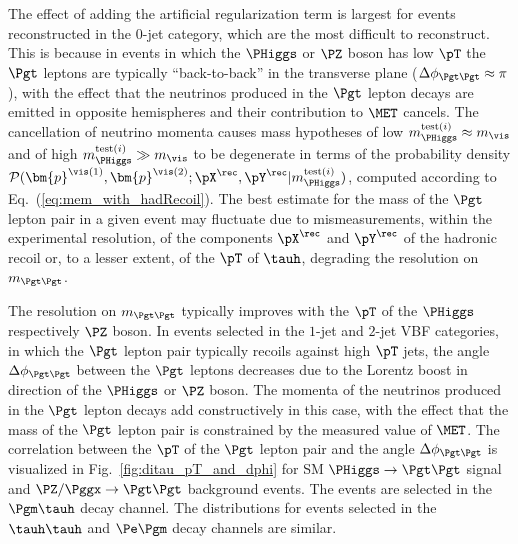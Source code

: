 The effect of adding the artificial regularization term is largest for events reconstructed in the $0$-jet category,
which are the most difficult to reconstruct.
This is because in events in which the $\PHiggs$ or $\PZ$ boson has low $\pT$
the $\Pgt$ leptons are typically ``back-to-back'' in the transverse plane ($\Delta\phi_{\Pgt\Pgt} \approx \pi$), 
with the effect that the neutrinos produced in the $\Pgt$ lepton decays are emitted in opposite hemispheres and their contribution to $\MET$ cancels.
The cancellation of neutrino momenta causes mass hypotheses of low $m_{\PHiggs}^{\textrm{test}(i)} \approx m_{\vis}$
and of high $m_{\PHiggs}^{\textrm{test}(i)} \gg m_{\vis}$
to be degenerate in terms of the probability density $\mathcal{P}(\bm{p}^{\vis(1)},\bm{p}^{\vis(2)};\pX^{\rec},\pY^{\rec}|m_{\PHiggs}^{\textrm{test}(i)})$,
computed according to Eq.~(\ref{eq:mem_with_hadRecoil}).
The best estimate for the mass of the $\Pgt$ lepton pair in a given event may fluctuate 
due to mismeasurements, within the experimental resolution, of the components $\pX^{\rec}$ and $\pY^{\rec}$ of the hadronic recoil or, to a lesser extent, of the $\pT$ of $\tauh$,
degrading the resolution on $m_{\Pgt\Pgt}$.

The resolution on $m_{\Pgt\Pgt}$ typically improves with the $\pT$ of the $\PHiggs$ respectively $\PZ$ boson.
In events selected in the $1$-jet and $2$-jet VBF categories,
in which the $\Pgt$ lepton pair typically recoils against high $\pT$ jets,
the angle $\Delta\phi_{\Pgt\Pgt}$ between the $\Pgt$ leptons decreases due to the Lorentz boost in direction of the $\PHiggs$ or $\PZ$ boson.
The momenta of the neutrinos produced in the $\Pgt$ lepton decays add constructively in this case,
with the effect that the mass of the $\Pgt$ lepton pair is constrained by the measured value of $\MET$.
The correlation between the $\pT$ of the $\Pgt$ lepton pair and the angle $\Delta\phi_{\Pgt\Pgt}$ is visualized in Fig.~\ref{fig:ditau_pT_and_dphi}
for SM $\PHiggs \to \Pgt\Pgt$ signal and $\PZ/\Pggx \to \Pgt\Pgt$ background events.
The events are selected in the $\Pgm\tauh$ decay channel.
The distributions for events selected in the $\tauh\tauh$ and $\Pe\Pgm$ decay channels are similar.

